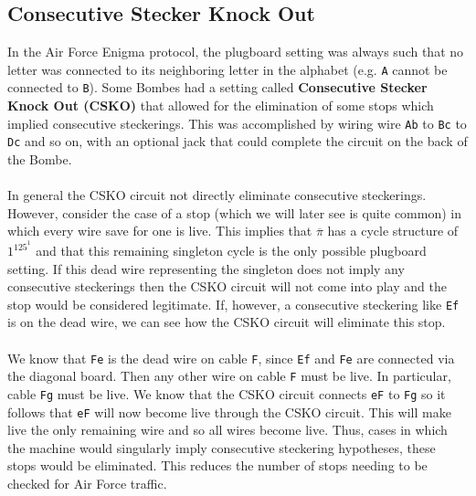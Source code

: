 \subsection{Consecutive Stecker Knock Out}
In the Air Force Enigma protocol, the plugboard setting was always such that no letter was connected to its neighboring letter in the alphabet (e.g. \texttt{A} cannot be connected to \texttt{B}). Some Bombes had a setting called {\bf{Consecutive Stecker Knock Out (CSKO)}} that allowed for the elimination of some stops which implied consecutive steckerings. This was accomplished by wiring wire \texttt{Ab} to \texttt{Bc} to \texttt{Dc} and so on, with an optional jack that could complete the circuit on the back of the Bombe.
\\\\In general the CSKO circuit not directly eliminate consecutive steckerings. However, consider the case of a stop (which we will later see is quite common) in which every wire save for one is live. This implies that $\overline\pi$ has a cycle structure of $1^125^1$ and that this remaining singleton cycle is the only possible plugboard setting. If this dead wire representing the singleton does not imply any consecutive steckerings then the CSKO circuit will not come into play and the stop would be considered legitimate. If, however, a consecutive steckering like \texttt{Ef} is on the dead wire, we can see how the CSKO circuit will eliminate this stop.
\\\\We know that \texttt{Fe} is the dead wire on cable \texttt{F}, since \texttt{Ef} and \texttt{Fe} are connected via the diagonal board. Then any other wire on cable \texttt{F} must be live. In particular, cable \texttt{Fg} must be live. We know that the CSKO circuit connects \texttt{eF} to \texttt{Fg} so it follows that \texttt{eF} will now become live through the CSKO circuit. This will make live the only remaining wire and so all wires become live. Thus, cases in which the machine would singularly imply consecutive steckering hypotheses, these stops would be eliminated. This reduces the number of stops needing to be checked for Air Force traffic.

